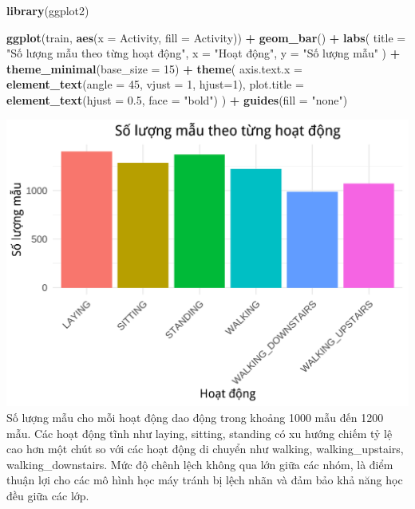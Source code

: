 \documentclass[
]{article}
\newenvironment{Shaded}{\begin{snugshade}}{\end{snugshade}}
\newcommand{\AttributeTok}[1]{\textcolor[rgb]{0.13,0.29,0.53}{#1}}
\newcommand{\DecValTok}[1]{\textcolor[rgb]{0.00,0.00,0.81}{#1}}
\newcommand{\FloatTok}[1]{\textcolor[rgb]{0.00,0.00,0.81}{#1}}
\newcommand{\FunctionTok}[1]{\textcolor[rgb]{0.13,0.29,0.53}{\textbf{#1}}}
\newcommand{\NormalTok}[1]{#1}
\newcommand{\SpecialCharTok}[1]{\textcolor[rgb]{0.81,0.36,0.00}{\textbf{#1}}}
\newcommand{\StringTok}[1]{\textcolor[rgb]{0.31,0.60,0.02}{#1}}
\begin{document}
\begin{Shaded}
\begin{Highlighting}[]
\FunctionTok{library}\NormalTok{(ggplot2)}

\FunctionTok{ggplot}\NormalTok{(train, }\FunctionTok{aes}\NormalTok{(}\AttributeTok{x =}\NormalTok{ Activity, }\AttributeTok{fill =}\NormalTok{ Activity)) }\SpecialCharTok{+}
  \FunctionTok{geom\_bar}\NormalTok{() }\SpecialCharTok{+}
  \FunctionTok{labs}\NormalTok{(}
    \AttributeTok{title =} \StringTok{"Số lượng mẫu theo từng hoạt động"}\NormalTok{,}
    \AttributeTok{x =} \StringTok{"Hoạt động"}\NormalTok{,}
    \AttributeTok{y =} \StringTok{"Số lượng mẫu"}
\NormalTok{  ) }\SpecialCharTok{+}
  \FunctionTok{theme\_minimal}\NormalTok{(}\AttributeTok{base\_size =} \DecValTok{15}\NormalTok{) }\SpecialCharTok{+}
  \FunctionTok{theme}\NormalTok{(}
    \AttributeTok{axis.text.x =} \FunctionTok{element\_text}\NormalTok{(}\AttributeTok{angle =} \DecValTok{45}\NormalTok{, }\AttributeTok{vjust =} \DecValTok{1}\NormalTok{, }\AttributeTok{hjust=}\DecValTok{1}\NormalTok{),}
    \AttributeTok{plot.title =} \FunctionTok{element\_text}\NormalTok{(}\AttributeTok{hjust =} \FloatTok{0.5}\NormalTok{, }\AttributeTok{face =} \StringTok{"bold"}\NormalTok{)}
\NormalTok{  ) }\SpecialCharTok{+}
  \FunctionTok{guides}\NormalTok{(}\AttributeTok{fill =} \StringTok{"none"}\NormalTok{)}
\end{Highlighting}
\end{Shaded}

\includegraphics{report_files/figure-latex/unnamed-chunk-11-1.pdf} Số
lượng mẫu cho mỗi hoạt động dao động trong khoảng 1000 mẫu đến 1200 mẫu.
Các hoạt động tĩnh như laying, sitting, standing có xu hướng chiếm tỷ lệ
cao hơn một chút so với các hoạt động di chuyển như walking,
walking\_upstairs, walking\_downstairs. Mức độ chênh lệch không qua lớn
giữa các nhóm, là điểm thuận lợi cho các mô hình học máy tránh bị lệch
nhãn và đảm bảo khả năng học đều giữa các lớp.
\end{document}
